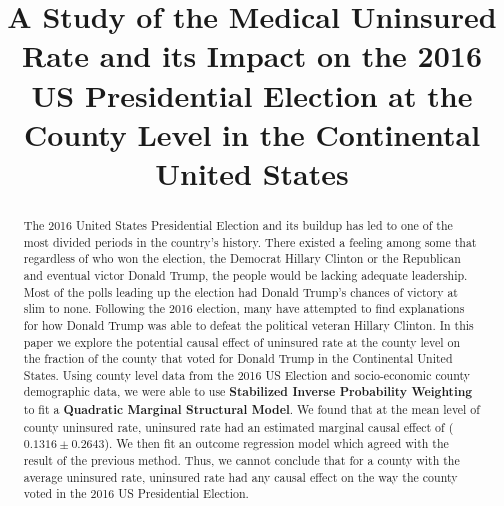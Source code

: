 \documentclass[11pt, conference,compsoc]{IEEEtran}
\begin{document}
\title{A Study of the Medical Uninsured Rate and its
Impact on the 2016 US Presidential Election at the County Level in the Continental United States}

\author{
\and
{}
}

\maketitle

\begin{abstract}
The 2016 United States Presidential Election and its buildup has led to one of the most divided periods in the country's history. There existed a feeling among some that regardless of who won the election, the Democrat Hillary Clinton or the Republican and eventual victor Donald Trump, the people would be lacking adequate leadership. Most of the polls leading up the election had Donald Trump's chances of victory at slim to none. Following the 2016 election, many have attempted to find explanations for how Donald Trump was able to defeat the political veteran Hillary Clinton. In this paper we explore the potential causal effect of uninsured rate at the county level on the fraction of the county that voted for Donald Trump in the Continental United States. Using county level data from the 2016 US Election and socio-economic county demographic data, we were able to use \textbf{Stabilized Inverse Probability Weighting} to fit a \textbf{Quadratic Marginal Structural Model}. We found that at the mean level of county uninsured rate, uninsured rate had an estimated marginal causal effect of ($0.1316 \pm 0.2643$). We then fit an outcome regression model which agreed with the result of the previous method. Thus, we cannot conclude that for a county with the average uninsured rate, uninsured rate had any causal effect on the way the county voted in the 2016 US Presidential Election.
\end{abstract}
\end{document}
